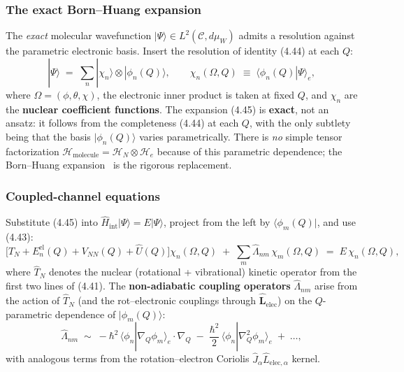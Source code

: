 \subsubsection{The exact Born--Huang expansion}

The \emph{exact} molecular wavefunction $|\Psi\rangle \in L^{2}(\mathcal{C},d\mu_W)$ admits a resolution against the parametric electronic basis. Insert the resolution of identity (4.44) at each $Q$:
\begin{equation}
|\Psi\rangle \;=\; \sum_n |\chi_n\rangle \otimes |\phi_n(Q)\rangle, \qquad \chi_n(\Omega,Q) \;\equiv\; \langle\phi_n(Q)|\Psi\rangle_e, \tag{4.45}
\end{equation}
where $\Omega=(\phi,\theta,\chi)$, the electronic inner product is taken at fixed $Q$, and $\chi_n$ are the \textbf{nuclear coefficient functions}. The expansion (4.45) is \textbf{exact}, not an ansatz: it follows from the completeness (4.44) at each $Q$, with the only subtlety being that the basis $|\phi_n(Q)\rangle$ varies parametrically. There is \emph{no} simple tensor factorization $\mathcal{H}_{\mathrm{molecule}} = \mathcal{H}_N \otimes \mathcal{H}_e$ because of this parametric dependence; the Born--Huang expansion~\cite{bornhuang1954} is the rigorous replacement.

\subsubsection{Coupled-channel equations}

Substitute (4.45) into $\hat H_{\mathrm{int}}|\Psi\rangle = E|\Psi\rangle$, project from the left by $\langle\phi_m(Q)|$, and use (4.43):
\begin{equation}
\bigl[\hat T_N + E_n^{\mathrm{el}}(Q) + V_{NN}(Q) + \hat U(Q)\bigr]\chi_n(\Omega,Q) \;+\; \sum_m \hat\Lambda_{nm}\,\chi_m(\Omega,Q) \;=\; E\,\chi_n(\Omega,Q), \tag{4.46}
\end{equation}
where $\hat T_N$ denotes the nuclear (rotational + vibrational) kinetic operator from the first two lines of (4.41). The \textbf{non-adiabatic coupling operators} $\hat\Lambda_{nm}$ arise from the action of $\hat T_N$ (and the rot--electronic couplings through $\hat{\mathbf{L}}_{\mathrm{elec}}$) on the $Q$-parametric dependence of $|\phi_m(Q)\rangle$:
\begin{equation}
\hat\Lambda_{nm} \;\sim\; -\hbar^{2}\,\langle\phi_n|\nabla_Q\phi_m\rangle_e\!\cdot\!\nabla_Q \;-\; \frac{\hbar^{2}}{2}\,\langle\phi_n|\nabla_Q^{2}\phi_m\rangle_e \;+\;\ldots, \tag{4.47}
\end{equation}
with analogous terms from the rotation--electron Coriolis $\hat J_\alpha\hat L_{\mathrm{elec},\alpha}$ kernel.

